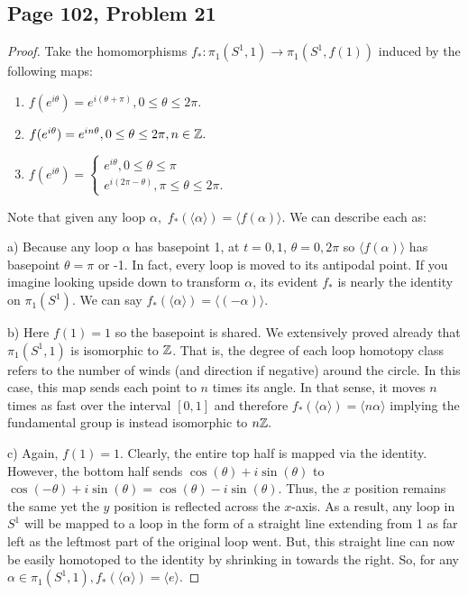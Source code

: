 \subsection*{Page 102, Problem 21}
\vspace{15pt}
\begin{proof}
    \vspace{-10pt}
    Take the homomorphisms $f_*\colon\pi_1(S^1,1)\to\pi_1(S^1,f(1))$ induced by the following maps:
    \begin{enumerate}[label = \alph*)]
        \item $f(e^{i\theta}) = e^{i(\theta+\pi)}, 0 \leq \theta \leq 2\pi.$
        \item $f(e^{i\theta}) = e^{in\theta}, 0 \leq \theta \leq 2\pi, n \in \mathbb{Z}.$
        \item $f(e^{i\theta}) = \begin{cases}e^{i\theta}, 0 \leq \theta \leq \pi \\ e^{i(2\pi - \theta)}, \pi \leq \theta \leq 2\pi.\end{cases}$
    \end{enumerate}

    Note that given any loop $\alpha,$ $f_*(\langle\alpha\rangle) = \langle f(\alpha)\rangle.$ We can describe each as:
    
    a) Because any loop $\alpha$ has basepoint 1, at $t = 0,1$, $\theta = 0, 2\pi$ so $\langle f(\alpha)\rangle$ has basepoint $\theta = \pi$ or -1. In fact, every loop is  moved to its antipodal point. If you imagine  looking upside down to transform $\alpha$, its evident $f_*$ is nearly the identity on $\pi_1(S^1).$ We can say $f_*(\langle\alpha\rangle) = \langle (-\alpha) \rangle.$

    b) Here $f(1) = 1$ so the basepoint is shared. We extensively proved already that $\pi_1(S^1,1)$ is isomorphic to $\mathbb{Z}$. That is, the degree of each loop homotopy class refers to the number of winds (and direction if negative) around the circle. In this case, this map sends each point to $n$ times its angle. In that sense, it moves $n$ times as fast over the interval $[0,1]$ and therefore $f_*(\langle\alpha\rangle) = \langle n\alpha \rangle$ implying the fundamental group is instead isomorphic to $n\mathbb{Z}.$

    c) Again, $f(1) = 1$. Clearly, the entire top half is mapped via the identity. However, the bottom half sends $\cos(\theta) + i\sin(\theta)$ to $\cos(-\theta) + i\sin(\theta) = \cos(\theta) - i\sin(\theta).$ Thus, the $x$ position remains the same yet the $y$ position is reflected across the $x$-axis. As a result, any loop in $S^1$ will be mapped to a loop in the form of a straight line extending from 1 as far left as the leftmost part of the original loop went. But, this straight line can now be easily homotoped to the identity by shrinking in towards the right. So, for any $\alpha \in \pi_1(S^1,1), f_*(\langle\alpha\rangle) = \langle e \rangle.$
\end{proof}